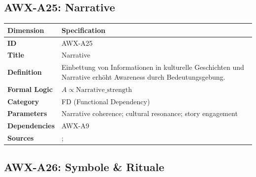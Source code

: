 
\subsection{AWX-A25: Narrative}

\begin{table}[htbp]
\small
\begin{tabular}{p{3cm}p{11cm}}
\toprule
\textbf{Dimension} & \textbf{Specification} \\
\midrule
\textbf{ID} & AWX-A25 \\
\textbf{Title} & Narrative \\
\textbf{Definition} & Einbettung von Informationen in kulturelle Geschichten und Narrative erhöht Awareness durch Bedeutungsgebung. \\
\textbf{Formal Logic} & $A \propto \text{Narrative\_strength}$ \\
\textbf{Category} & FD (Functional Dependency) \\
\textbf{Parameters} & Narrative coherence; cultural resonance; story engagement \\
\textbf{Dependencies} & AWX-A9 \\
\textbf{Sources} & \citet{shiller2019narrative}; \citet{akerlof2009animal} \\
\bottomrule
\end{tabular}
\end{table}


\subsection{AWX-A26: Symbole \& Rituale}

